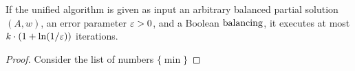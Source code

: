 \begin{lemma}
If the unified algorithm is given as input an arbitrary balanced partial solution $(A,w)$, an error parameter $\varepsilon>0$, and a Boolean $\operatorname{balancing}$, it executes at most $k\cdot(1+\ln(1/\varepsilon))$ iterations. 
\end{lemma}
\begin{proof}
Consider the list of numbers $\{\min\}$
\end{proof}